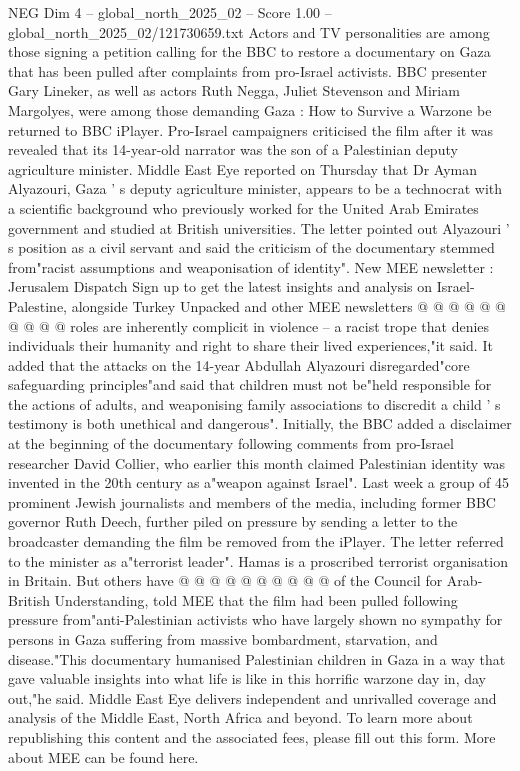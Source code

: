 \begin{textsample}{NEG Dim 4 – global\_north\_2025\_02 – Score 1.00 – global\_north\_2025\_02/121730659.txt}  \label{ex:f4_neg_410}
Actors and TV personalities are among those signing a petition calling for the BBC to restore a documentary on Gaza that has been pulled after complaints from pro-Israel activists.
BBC presenter Gary Lineker, as well as actors Ruth Negga, Juliet Stevenson and Miriam Margolyes, were among those demanding Gaza : How to Survive a Warzone be returned to BBC iPlayer.
Pro-Israel campaigners criticised the film after it was revealed that its 14-year-old narrator was the son of a Palestinian deputy agriculture minister.
Middle East Eye reported on Thursday that Dr Ayman Alyazouri, Gaza ' s deputy agriculture minister, appears to be a technocrat with a scientific background who previously worked for the United Arab Emirates government and studied at British universities.
The letter pointed out Alyazouri ' s position as a civil servant and said the criticism of the documentary stemmed from"racist assumptions and weaponisation of identity".
New MEE newsletter : Jerusalem Dispatch Sign up to get the latest insights and analysis on Israel-Palestine, alongside Turkey Unpacked and other MEE newsletters @ @ @ @ @ @ @ @ @ @ roles are inherently complicit in violence -- a racist trope that denies individuals their humanity and right to share their lived experiences,"it said.
It added that the attacks on the 14-year Abdullah Alyazouri disregarded"core safeguarding principles"and said that children must not be"held responsible for the actions of adults, and weaponising family associations to discredit a child ' s testimony is both unethical and dangerous".
Initially, the BBC added a disclaimer at the beginning of the documentary following comments from pro-Israel researcher David Collier, who earlier this month claimed Palestinian identity was invented in the 20th century as a"weapon against Israel".
Last week a group of 45 prominent Jewish journalists and members of the media, including former BBC governor Ruth Deech, further piled on pressure by sending a letter to the broadcaster demanding the film be removed from the iPlayer.
The letter referred to the minister as a"terrorist leader".
Hamas is a proscribed terrorist organisation in Britain.
But others have @ @ @ @ @ @ @ @ @ @ of the Council for Arab-British Understanding, told MEE that the film had been pulled following pressure from"anti-Palestinian activists who have largely shown no sympathy for persons in Gaza suffering from massive bombardment, starvation, and disease."This documentary humanised Palestinian children in Gaza in a way that gave valuable insights into what life is like in this horrific warzone day in, day out,"he said.
Middle East Eye delivers independent and unrivalled coverage and analysis of the Middle East, North Africa and beyond.
To learn more about republishing this content and the associated fees, please fill out this form.
More about MEE can be found here.

\end{textsample}
